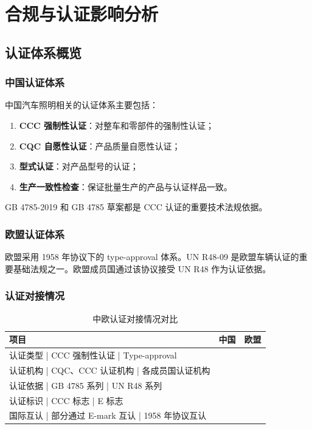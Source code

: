 \chapter{合规与认证影响分析}

\section{认证体系概览}

\subsection{中国认证体系}

中国汽车照明相关的认证体系主要包括：

\begin{enumerate}[leftmargin=2em]
    \item \textbf{CCC 强制性认证}：对整车和零部件的强制性认证；
    \item \textbf{CQC 自愿性认证}：产品质量自愿性认证；
    \item \textbf{型式认证}：对产品型号的认证；
    \item \textbf{生产一致性检查}：保证批量生产的产品与认证样品一致。
\end{enumerate}

GB 4785-2019 和 GB 4785 草案都是 CCC 认证的重要技术法规依据。

\subsection{欧盟认证体系}

欧盟采用 1958 年协议下的 type-approval 体系。UN R48-09 是欧盟车辆认证的重要基础法规之一。欧盟成员国通过该协议接受 UN R48 作为认证依据。

\subsection{认证对接情况}

\begin{table}[H]
\centering
\caption{中欧认证对接情况对比}
\small
\begin{tabularx}{\textwidth}{|l|X|X|}
\hline
\textbf{项目} & \textbf{中国} & \textbf{欧盟} \\
\hline
认证类型       | CCC 强制性认证    | Type-approval \\
\hline
认证机构       | CQC、CCC 认证机构 | 各成员国认证机构 \\
\hline
认证依据       | GB 4785 系列     | UN R48 系列 \\
\hline
认证标识       | CCC 标志          | E 标志 \\
\hline
国际互认       | 部分通过 E-mark 互认 | 1958 年协议互认 \\
\hline
\end{tabularx}
\end{table}

